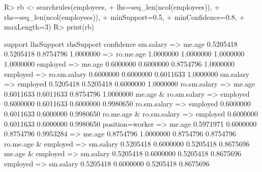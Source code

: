 \begin{Schunk}
% --begin: "searchrules"
\begin{Sinput}
R> rb <- searchrules(employees,
+                    lhs=seq_len(ncol(employees)),
+                    rhs=seq_len(ncol(employees)),
+                    minSupport=0.5,
+                    minConfidence=0.8,
+                    maxLength=3)
R> print(rb)
\end{Sinput}
\begin{Soutput}
                                       support lhsSupport rhsSupport confidence
sm.salary => me.age                  0.5205418  0.5205418  0.8754796  1.0000000
 => ro.me.age                        1.0000000  1.0000000  1.0000000  1.0000000
employed => me.age                   0.6000000  0.6000000  0.8754796  1.0000000
employed => ro.sm.salary             0.6000000  0.6000000  0.6011633  1.0000000
sm.salary => employed                0.5205418  0.5205418  0.6000000  1.0000000
ro.sm.salary => me.age               0.6011633  0.6011633  0.8754796  1.0000000
me.age & ro.sm.salary => employed    0.6000000  0.6011633  0.6000000  0.9980650
ro.sm.salary => employed             0.6000000  0.6011633  0.6000000  0.9980650
ro.me.age & ro.sm.salary => employed 0.6000000  0.6011633  0.6000000  0.9980650
position=worker => me.age            0.5971971  0.6000000  0.8754796  0.9953284
 => me.age                           0.8754796  1.0000000  0.8754796  0.8754796
ro.me.age & employed => sm.salary    0.5205418  0.6000000  0.5205418  0.8675696
me.age & employed => sm.salary       0.5205418  0.6000000  0.5205418  0.8675696
employed => sm.salary                0.5205418  0.6000000  0.5205418  0.8675696
\end{Soutput}
%
% --end: "searchrules"
\end{Schunk}
